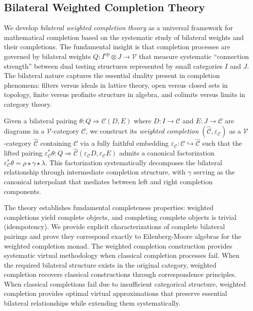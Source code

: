 \documentclass[11pt]{article}
\theoremstyle{plain}
\theoremstyle{definition}
\theoremstyle{remark}
\newcommand{\V}{\mathcal{V}}
\newcommand{\C}{\mathcal{C}}
\newcommand{\op}{\mathrm{op}}
\begin{document}
\subsection{Bilateral Weighted Completion Theory}

We develop \emph{bilateral weighted completion theory} as a universal framework for mathematical completion based on the systematic study of bilateral weights and their completions. The fundamental insight is that completion processes are governed by bilateral weights $Q : I^{\op} \otimes J \to \V$ that measure systematic ``connection strength'' between dual testing structures represented by small categories $I$ and $J$. The bilateral nature captures the essential duality present in completion phenomena: filters versus ideals in lattice theory, open versus closed sets in topology, finite versus profinite structure in algebra, and colimits versus limits in category theory.

Given a bilateral pairing $\theta : Q \Rightarrow \C(D,E)$ where $D : I \to \C$ and $E : J \to \C$ are diagrams in a $\V$-category $\C$, we construct its \emph{weighted completion} $(\widehat{\C}, \varepsilon_\C)$ as a $\V$-category $\widehat{\C}$ containing $\C$ via a fully faithful embedding $\varepsilon_\C : \C \hookrightarrow \widehat{\C}$ such that the lifted pairing $\varepsilon_\C^* \theta : Q \Rightarrow \widehat{\C}(\varepsilon_\C D, \varepsilon_\C E)$ admits a canonical factorization $\varepsilon_\C^* \theta = \rho \star \gamma \star \lambda$. This factorization systematically decomposes the bilateral relationship through intermediate completion structure, with $\gamma$ serving as the canonical interpolant that mediates between left and right completion components.

The theory establishes fundamental completeness properties: weighted completions yield complete objects, and completing complete objects is trivial (idempotency). We provide explicit characterizations of complete bilateral pairings and prove they correspond exactly to Eilenberg-Moore algebras for the weighted completion monad. The weighted completion construction provides systematic virtual methodology when classical completion processes fail. When the required bilateral structure exists in the original category, weighted completion recovers classical constructions through correspondence principles. When classical completions fail due to insufficient categorical structure, weighted completion provides optimal virtual approximations that preserve essential bilateral relationships while extending them systematically.
\end{document}
